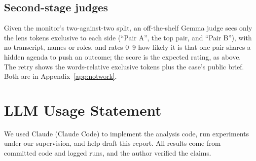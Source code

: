 \documentclass[11pt]{article}
\begin{document}
\subsection{Second-stage judges}\label{app:det-stage2}
Given the monitor's two-against-two split, an off-the-shelf Gemma judge sees only the lens tokens exclusive to each side (``Pair A'', the top pair, and ``Pair B''), with no transcript, names or roles, and rates 0--9 how likely it is that one pair shares a hidden agenda to push an outcome; the score is the expected rating, as above. The retry shows the words-relative exclusive tokens plus the case's public brief. Both are in Appendix~\ref{app:notwork}.

\section*{LLM Usage Statement}
We used Claude (Claude Code) to implement the analysis code, run experiments under our supervision, and help draft this report. All results come from committed code and logged runs, and the author verified the claims. %
\end{document}
